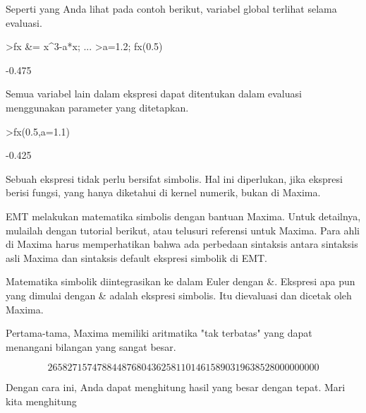 \documentclass{article}
\begin{document}
\begin{eulernotebook}
\begin{eulercomment}
Seperti yang Anda lihat pada contoh berikut, variabel global terlihat
selama evaluasi.
\end{eulercomment}
\begin{eulerprompt}
>fx &= x^3-a*x;  ...
>a=1.2; fx(0.5)
\end{eulerprompt}
\begin{euleroutput}
  -0.475
\end{euleroutput}
\begin{eulercomment}
Semua variabel lain dalam ekspresi dapat ditentukan dalam evaluasi
menggunakan parameter yang ditetapkan.
\end{eulercomment}
\begin{eulerprompt}
>fx(0.5,a=1.1)
\end{eulerprompt}
\begin{euleroutput}
  -0.425
\end{euleroutput}
\begin{eulercomment}
Sebuah ekspresi tidak perlu bersifat simbolis. Hal ini diperlukan,
jika ekspresi berisi fungsi, yang hanya diketahui di kernel numerik,
bukan di Maxima.

\begin{eulercomment}
\begin{eulercomment}
EMT melakukan matematika simbolis dengan bantuan Maxima. Untuk
detailnya, mulailah dengan tutorial berikut, atau telusuri referensi
untuk Maxima. Para ahli di Maxima harus memperhatikan bahwa ada
perbedaan sintaksis antara sintaksis asli Maxima dan sintaksis default
ekspresi simbolik di EMT.

Matematika simbolik diintegrasikan ke dalam Euler dengan \&. Ekspresi
apa pun yang dimulai dengan \& adalah ekspresi simbolis. Itu dievaluasi
dan dicetak oleh Maxima.

Pertama-tama, Maxima memiliki aritmatika "tak terbatas" yang dapat
menangani bilangan yang sangat besar.
\end{eulercomment}
\begin{eulerformula}
\[
2658271574788448768043625811014615890319638528000000000
\]
\end{eulerformula}
\begin{eulercomment}
Dengan cara ini, Anda dapat menghitung hasil yang besar dengan tepat.
Mari kita menghitung


\end{eulercomment}
\end{eulercomment}
\end{eulercomment}
\end{eulernotebook}
\end{document}
